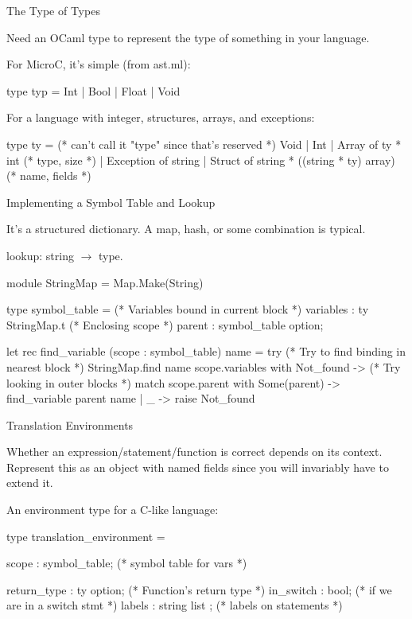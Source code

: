\documentclass{plt}
\begin{document}
\begin{frame}[fragile]{The Type of Types}

  Need an OCaml type to represent the type of something in your language.

For MicroC, it's simple (from ast.ml):

\begin{ocaml}
type typ  = Int | Bool | Float | Void
\end{ocaml}

For a language with integer, structures, arrays, and exceptions:

\begin{ocaml}
type ty = (* can't call it "type" since that's reserved *)
    Void
  | Int
  | Array of ty * int                        (* type, size *)
  | Exception of string
  | Struct of string * ((string * ty) array) (* name, fields *)
\end{ocaml}

\end{frame}


\begin{frame}[fragile]{Implementing a Symbol Table and Lookup}

It's a structured dictionary.  A map, hash, or some combination is typical.

lookup: string $\rightarrow$ type.

\begin{ocaml}
module StringMap = Map.Make(String)

type symbol_table = {
  (* Variables bound in current block *)
  variables : ty StringMap.t 
  (* Enclosing scope *)
  parent : symbol_table option;
}
\end{ocaml}

\begin{ocaml}
let rec find_variable (scope : symbol_table) name =
  try
     (* Try to find binding in nearest block *)
     StringMap.find name scope.variables
  with Not_found -> (* Try looking in outer blocks *)
    match scope.parent with
      Some(parent) -> find_variable parent name
    | _ -> raise Not_found
\end{ocaml}
\end{frame}

\begin{frame}[fragile]{Translation Environments}

Whether an expression/statement/function is correct depends on its
context.  Represent this as an object with named fields since you will
invariably have to extend it.

An environment type for a C-like language:

\begin{ocaml}
type translation_environment = {
    scope : symbol_table;    (* symbol table for vars *)

    return_type : ty option; (* Function's return type *)
    in_switch : bool;        (* if we are in a switch stmt *)
    labels : string list ;   (* labels on statements *)
}
\end{ocaml}

\end{frame}
\end{document}
